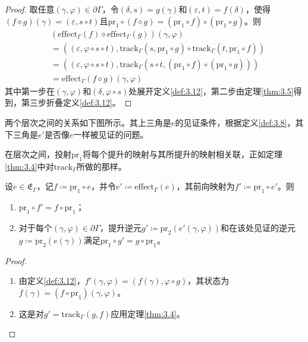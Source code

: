 \begin{proof}
取任意$(\gamma, \varphi) \in \partial\Gamma$，令$(\delta, s) = g(\gamma)$和$(\varepsilon, t) = f(\delta)$，使得$(f \diamond g)(\gamma) = (\varepsilon, s \circ t)$且$\mathrm{pr}_1 \circ (f \diamond g) = (\mathrm{pr}_1 \circ f) \circ (\mathrm{pr}_1 \circ g)$。则
\begin{align*}
&(\mathrm{effect}_\Gamma(f) \diamond \mathrm{effect}_\Gamma(g))(\gamma, \varphi) \\
&= ((\varepsilon, \varphi \circ s \circ t), \mathrm{track}_\Gamma(s, \mathrm{pr}_1 \circ g) \circ \mathrm{track}_\Gamma(t, \mathrm{pr}_1 \circ f)) \\
&= ((\varepsilon, \varphi \circ s \circ t), \mathrm{track}_\Gamma(s \circ t, (\mathrm{pr}_1 \circ f) \circ (\mathrm{pr}_1 \circ g))) \\
&= \mathrm{effect}_\Gamma(f \diamond g)(\gamma, \varphi)
\end{align*}
其中第一步在$(\gamma, \varphi)$和$(\delta, \varphi \circ s)$处展开定义\ref{def:3.12}，第二步由定理\ref{thm:3.5}得到，第三步折叠定义\ref{def:3.12}。
\end{proof}

两个层次之间的关系如下图所示。其上三角是$e$的见证条件，根据定义\ref{def:3.8}，其下三角是$e'$是否像$e$一样被见证的问题。

在层次之间，投射$\mathrm{pr}_1$将每个提升的映射与其所提升的映射相关联，正如定理\ref{thm:3.4}中对$\mathrm{track}_\Gamma$所做的那样。

\begin{theorem}\label{thm:3.14}
设$e \in \mathfrak{E}_\Gamma$，记$f \coloneqq \mathrm{pr}_1 \circ e$，并令$e' \coloneqq \mathrm{effect}_\Gamma(e)$，其前向映射为$f' \coloneqq \mathrm{pr}_1 \circ e'$。则
\begin{enumerate}
\item $\mathrm{pr}_1 \circ f' = f \circ \mathrm{pr}_1$；
\item 对于每个$(\gamma, \varphi) \in \partial\Gamma$，提升逆元$g' \coloneqq \mathrm{pr}_2(e'(\gamma, \varphi))$和在该处见证的逆元$g \coloneqq \mathrm{pr}_2(e(\gamma))$满足$\mathrm{pr}_1 \circ g' = g \circ \mathrm{pr}_1$。
\end{enumerate}
\end{theorem}

\begin{proof}
\begin{enumerate}
\item 由定义\ref{def:3.12}，$f'(\gamma, \varphi) = (f(\gamma), \varphi \circ g)$，其状态为$f(\gamma) = (f \circ \mathrm{pr}_1)(\gamma, \varphi)$。
\item 这是对$g' = \mathrm{track}_\Gamma(g, f)$应用定理\ref{thm:3.4}。
\end{enumerate}
\end{proof}

